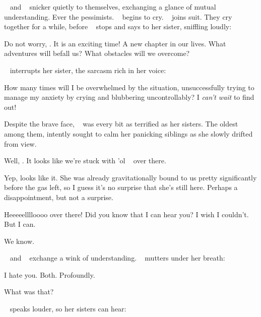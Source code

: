 \documentclass[main.tex]{subfiles}
\begin{document}
\par \nar \rmtaygete~ and \rmalcyone~ snicker quietly to themselves, exchanging a glance of mutual understanding.  Ever the pessimists.  \rmelectra~ begins to cry.  \rmsterope~ joins suit.  They cry together for a while, before \rmsterope~ stops and says to her sister, sniffling loudly:

\par \Sterope Do not worry, \rmelectra.  It is an exciting time!  A new chapter in our lives.  What adventures will befall us?  What obstacles will we overcome?  

\par \nar \rmelectra~ interrupts her sister, the sarcasm rich in her voice:

\par \Electra How many times will I be overwhelmed by the situation, unsuccessfully trying to manage my anxiety by crying and blubbering uncontrollably? I \textit{can't wait} to find out!

\par \nar Despite the brave face, \rmmaia~ was every bit as terrified as her sisters.  The oldest among them, \rmmaia intently sought to calm her panicking siblings as she slowly drifted from view.

\par \Taygete Well, \rmalcyone.  It looks like we're stuck with 'ol \rmcelaeno~ over there.

\par \Alcyone Yep, looks like it.  She was already gravitationally bound to us pretty significantly before the gas left, so I guess it's no surprise that she's still here.  Perhaps a disappointment, but not a surprise.

\par \Celaeno Heeeeelllloooo over there!  Did you know that I can hear you?  I wish I couldn't.  But I can.  

\par \Taygete We know. 

\par \nar \rmtaygete~ and \rmalcyone~ exchange a wink of understanding.  \rmcelaeno~ mutters under her breath:

\par \Celaeno I hate you.  Both.  Profoundly.

\par \Taygete What was that?

\par \nar \rmcelaeno~ speaks louder, so her sisters can hear:
\end{document}
